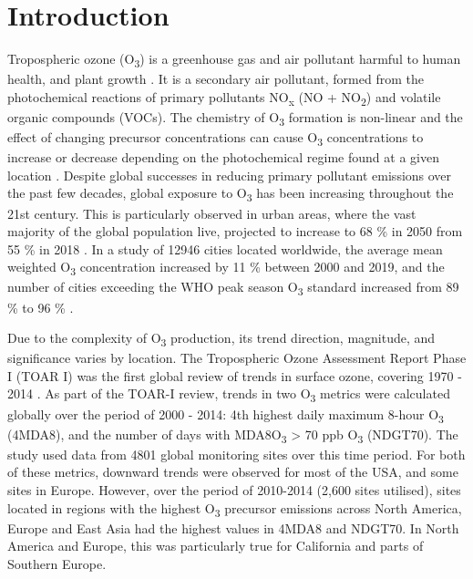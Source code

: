 \documentclass[journal abbreviation, manuscript]{copernicus}
\begin{document}
\section{Introduction}  %
Tropospheric ozone (O\textsubscript{3}) is a greenhouse gas and air pollutant harmful to human health, and plant growth \citep{fleming_2018, mills_2018, szopa_2021}. It is a secondary air pollutant, formed from the photochemical reactions of primary pollutants NO\textsubscript{x} (NO + NO\textsubscript{2}) and volatile organic compounds (VOCs). The chemistry of O\textsubscript{3} formation is non-linear and the effect of changing precursor concentrations can cause O\textsubscript{3} concentrations to increase or decrease depending on the photochemical regime found at a given location \citep{ https://doi.org/10.1029/JD095iD02p01837, SILLMAN2002339}. Despite global successes in reducing primary pollutant emissions over the past few decades, global exposure to O\textsubscript{3} has been increasing throughout the 21st century. This is particularly observed in urban areas, where the vast majority of the global population live, projected to increase to 68 \% in 2050 from 55 \% in 2018 \citep{un_2019}. In a study of 12946 cities located worldwide, the average mean weighted O\textsubscript{3} concentration increased by 11 \% between 2000 and 2019, and the number of cities exceeding the WHO peak season O\textsubscript{3} standard increased from 89 \% to 96 \% \citep{Malashock_2022}.

Due to the complexity of O\textsubscript{3} production, its trend direction, magnitude, and significance varies by location. The Tropospheric Ozone Assessment Report Phase I (TOAR I) was the first global review of trends in surface ozone, covering 1970 - 2014 \citep{fleming_2018, Gaudel2018}. As part of the TOAR-I review, trends in two O\textsubscript{3} metrics were calculated globally over the period of 2000 - 2014: 4th highest daily maximum 8-hour O\textsubscript{3} (4MDA8), and the number of days with MDA8O\textsubscript{3} > 70 ppb O\textsubscript{3} (NDGT70). The study used data from 4801 global monitoring sites over this time period. For both of these metrics, downward trends were observed for most of the USA, and some sites in Europe. However, over the period of 2010-2014 (2,600 sites utilised), sites located in regions with the highest O\textsubscript{3} precursor emissions across North America, Europe and East Asia had the highest values in 4MDA8 and NDGT70. In North America and Europe, this was particularly true for California and parts of Southern Europe.
\end{document}
